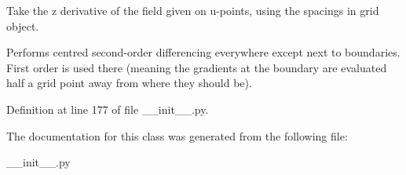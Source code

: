 Take the z derivative of the field given on u-\/points, using the spacings in grid object. 

Performs centred second-\/order differencing everywhere except next to boundaries. First order is used there (meaning the gradients at the boundary are evaluated half a grid point away from where they should be). 

Definition at line 177 of file \+\_\+\+\_\+init\+\_\+\+\_\+.\+py.



The documentation for this class was generated from the following file\+:\begin{DoxyCompactItemize}
\item 
\+\_\+\+\_\+init\+\_\+\+\_\+.\+py\end{DoxyCompactItemize}
